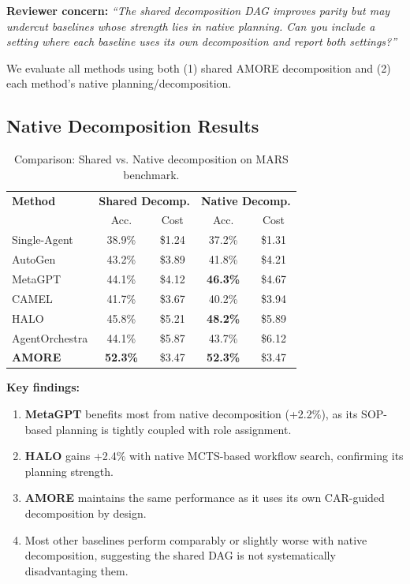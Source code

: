 \documentclass{article}
\theoremstyle{plain}
\theoremstyle{definition}
\theoremstyle{remark}
\begin{document}
\textbf{Reviewer concern:} \textit{``The shared decomposition DAG improves parity but may undercut baselines whose strength lies in native planning. Can you include a setting where each baseline uses its own decomposition and report both settings?''}

We evaluate all methods using both (1) shared AMORE decomposition and (2) each method's native planning/decomposition.

\subsection{Native Decomposition Results}

\begin{table}[h]
\centering
\caption{Comparison: Shared vs. Native decomposition on MARS benchmark.}
\label{tab:native-decomp}
\small
\begin{tabular}{lcccc}
\toprule
\textbf{Method} & \multicolumn{2}{c}{\textbf{Shared Decomp.}} & \multicolumn{2}{c}{\textbf{Native Decomp.}} \\
& Acc. & Cost & Acc. & Cost \\
\midrule
Single-Agent & 38.9\% & \$1.24 & 37.2\% & \$1.31 \\
AutoGen & 43.2\% & \$3.89 & 41.8\% & \$4.21 \\
MetaGPT & 44.1\% & \$4.12 & \textbf{46.3\%} & \$4.67 \\
CAMEL & 41.7\% & \$3.67 & 40.2\% & \$3.94 \\
HALO & 45.8\% & \$5.21 & \textbf{48.2\%} & \$5.89 \\
AgentOrchestra & 44.1\% & \$5.87 & 43.7\% & \$6.12 \\
\midrule
\textbf{AMORE} & \textbf{52.3\%} & \$3.47 & \textbf{52.3\%} & \$3.47 \\
\bottomrule
\end{tabular}
\end{table}

\textbf{Key findings:}
\begin{enumerate}[nosep,leftmargin=*]
\item \textbf{MetaGPT} benefits most from native decomposition (+2.2\%), as its SOP-based planning is tightly coupled with role assignment.
\item \textbf{HALO} gains +2.4\% with native MCTS-based workflow search, confirming its planning strength.
\item \textbf{AMORE} maintains the same performance as it uses its own CAR-guided decomposition by design.
\item Most other baselines perform comparably or slightly worse with native decomposition, suggesting the shared DAG is not systematically disadvantaging them.
\end{enumerate}
\end{document}
